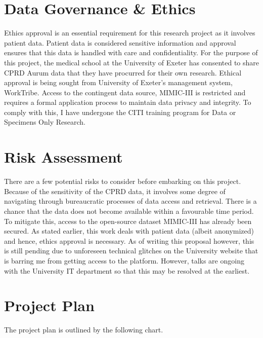 \documentclass[%
 reprint,
 amsmath,amssymb,
 aps,
 nofootinbib,
]{revtex4-2}
\theoremstyle{definition}
\begin{document}
\section{\label{gov}Data Governance \& Ethics}
Ethics approval is an essential requirement for this research project as it involves patient data. Patient data is considered sensitive information and approval ensures that this data is handled with care and confidentiality. For the purpose of this project, the medical school at the University of Exeter has consented to share CPRD Aurum data that they have procurred for their own research. Ethical approval is being sought from University of Exeter's management system, WorkTribe. Access to the contingent data source, MIMIC-III is restricted and requires a formal application process to maintain data privacy and integrity. To comply with this, I have undergone the CITI training program for Data or Specimens Only Research.

\section{\label{risk}Risk Assessment}
There are a few potential risks to consider before embarking on this project. Because of the sensitivity of the CPRD data, it involves some degree of navigating through bureaucratic processes of data access and retrieval. There is a chance that the data does not become available within a favourable time period. To mitigate this, access to the open-source dataset MIMIC-III has already been secured. As stated earlier, this work deals with patient data (albeit anonymized) and hence, ethics approval is necessary. As of writing this proposal however, this is still pending due to unforeseen technical glitches on the University website that is barring me from getting access to the platform. However, talks are ongoing with the University IT department so that this may be resolved at the earliest.

\section{\label{plan}Project Plan}
The project plan is outlined by the following chart.
\end{document}
